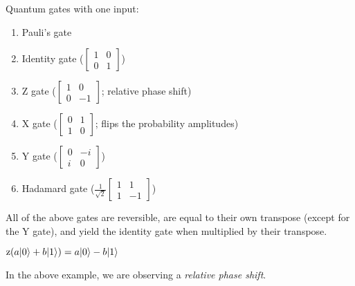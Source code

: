 Quantum gates with one input:
\begin{enumerate}
    \item Pauli's gate
    \item Identity gate ($\begin{bmatrix}
        1 & 0\\
        0 & 1
    \end{bmatrix}$)
    \item Z gate ($\begin{bmatrix}
        1 & 0\\
        0 & -1
    \end{bmatrix}$; relative phase shift)
    \item X gate ($\begin{bmatrix}
        0 & 1\\
        1 & 0
    \end{bmatrix}$; flips the probability amplitudes)
    \item Y gate ($\begin{bmatrix}
        0 & -i\\
        i & 0
    \end{bmatrix}$)
    \item Hadamard gate ($\frac{1}{\sqrt{2}}\begin{bmatrix}
        1 & 1\\
        1 & -1
    \end{bmatrix}$)
\end{enumerate}
All of the above gates are reversible, are equal to their own transpose (except for the Y gate), and yield the identity gate when multiplied by their transpose.

\begin{example}
    $\mathrm{z}(a\lvert0\rangle + b\lvert1\rangle) = a\lvert0\rangle - b\lvert1\rangle$
\end{example}

\begin{note}
    In the above example, we are observing a \emph{relative phase shift}.
\end{note}

\pagebreak

